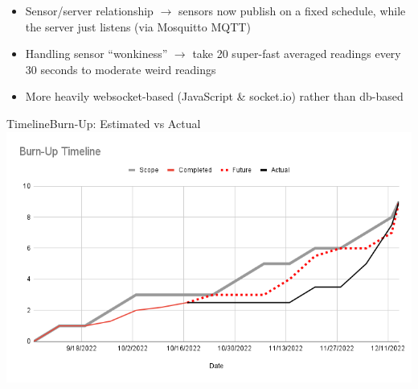 \documentclass[aspectratio=169]{beamer}
\begin{document}
  \begin{frame}{\sectitle}
    \begin{itemize}
      \item Sensor/server relationship $\rightarrow$ sensors now publish on a fixed schedule, while the server just listens (via Mosquitto MQTT)
      \item Handling sensor ``wonkiness'' $\rightarrow$ take 20 super-fast averaged readings every 30 seconds to moderate weird readings
      \item More heavily websocket-based (JavaScript \& socket.io) rather than db-based
    \end{itemize}
  \end{frame}


  \renewcommand{\sectitle}{Timeline}
  \begin{frame}{\sectitle}{Burn-Up: Estimated vs Actual}
    \includegraphics[width=\textwidth]{images/burn-up.png}
  \end{frame}
\end{document}
